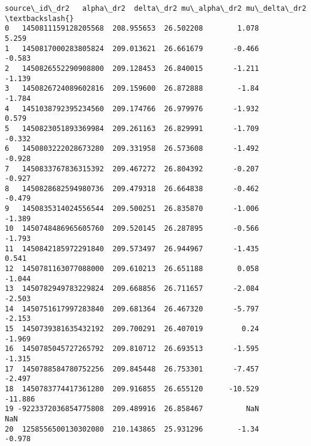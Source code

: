 \documentclass[11pt]{article}
\makeatletter
\newcommand{\boxspacing}{\kern\kvtcb@left@rule\kern\kvtcb@boxsep}
\newcommand{\prompt}[4]{
        {\ttfamily\llap{{\color{#2}[#3]:\hspace{3pt}#4}}\vspace{-\baselineskip}}
    }
\makeatother
\begin{document}
            \begin{tcolorbox}[breakable, size=fbox, boxrule=.5pt, pad at break*=1mm, opacityfill=0]
\prompt{Out}{outcolor}{22}{\boxspacing}
\begin{Verbatim}[commandchars=\\\{\}]
          source\_id\_dr2   alpha\_dr2  delta\_dr2 mu\_alpha\_dr2 mu\_delta\_dr2  \textbackslash{}
0   1450811159128205568  208.955653  26.502208        1.078        5.259
1   1450817000283805824  209.013621  26.661679       -0.466       -0.583
2   1450826552290908800  209.128453  26.840015       -1.211       -1.139
3   1450826724089602816  209.159600  26.872888        -1.84       -1.784
4   1451038792395234560  209.174766  26.979976       -1.932        0.579
5   1450823051893369984  209.261163  26.829991       -1.709       -0.332
6   1450803222028673280  209.331958  26.573608       -1.492       -0.928
7   1450833767836315392  209.467272  26.804392       -0.207       -0.927
8   1450828682594980736  209.479318  26.664838       -0.462       -0.479
9   1450835314024556544  209.500251  26.835870       -1.006       -1.389
10  1450748486965605760  209.520145  26.287895       -0.566       -1.793
11  1450842185972291840  209.573497  26.944967       -1.435        0.541
12  1450781163077088000  209.610213  26.651188        0.058       -1.044
13  1450782949783229824  209.668856  26.711657       -2.084       -2.503
14  1450751617997283840  209.681364  26.467320       -5.797       -2.153
15  1450739381635432192  209.700291  26.407019         0.24       -1.969
16  1450785045727265792  209.810712  26.693513       -1.595       -1.315
17  1450788584780752256  209.845448  26.753301       -7.457       -2.497
18  1450783774417361280  209.916855  26.655120      -10.529      -11.886
19 -9223372036854775808  209.489916  26.858467          NaN          NaN
20  1258556500130302080  210.143865  25.931296        -1.34       -0.978


\end{Verbatim}
\end{tcolorbox}
\end{document}
